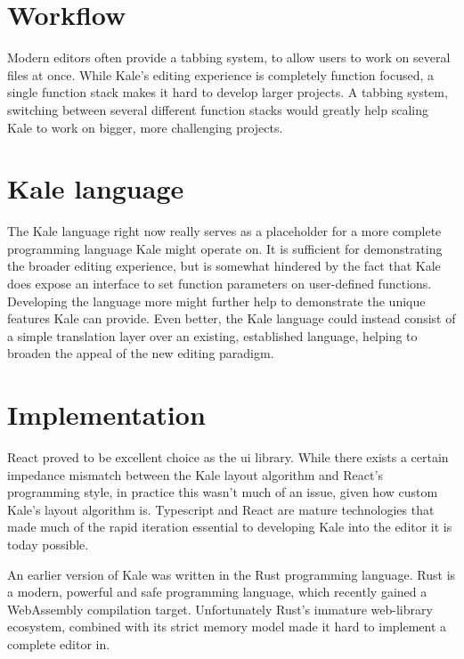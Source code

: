 \section{Workflow}
Modern editors often provide a tabbing system, to allow
users to work on several files at once. While Kale's editing experience
is completely function focused, a single function stack makes it hard
to develop larger projects. A tabbing system, switching between several
different function stacks would greatly help scaling Kale to work on bigger,
more challenging projects.

\section{Kale language}
The Kale language right now really serves as a placeholder for a more complete
programming language Kale might operate on.
It is sufficient for demonstrating the broader editing experience, but is somewhat
hindered by the fact that Kale does expose an interface to set function parameters
on user-defined functions. Developing the language more might further help to
demonstrate the unique features Kale can provide. Even better, the Kale language
could instead consist of a simple translation layer over an existing, established
language, helping to broaden the appeal of the new editing paradigm. 


\section{Implementation}
React proved to be excellent choice as the \ac{ui} library. While there exists a
certain impedance mismatch between the Kale layout algorithm and React's programming
style, in practice this wasn't much of an issue, given how custom Kale's layout
algorithm is. Typescript and React are mature technologies that made much of
the rapid iteration essential to developing Kale into the editor it is today possible.

An earlier version of Kale was written in the Rust programming language. Rust is a
modern, powerful and safe programming language, which recently gained a WebAssembly
compilation target. Unfortunately Rust's immature web-library ecosystem,
combined with its strict memory model made it hard to implement a complete editor in.